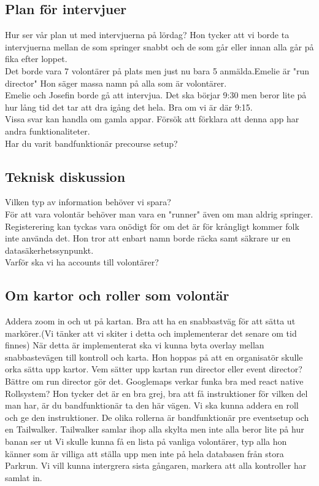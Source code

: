 \documentclass[a4paper, 11pt]{article}
\begin{document}
    \subsection*{Plan för intervjuer}
    Hur ser vår plan ut med intervjuerna på lördag? Hon tycker att vi borde ta intervjuerna mellan de som springer snabbt och de som går eller innan alla går på fika efter loppet.\\
    Det borde vara 7 volontärer på plats men just nu bara 5 anmälda.Emelie är "run director" Hon säger massa namn på alla som är volontärer.\\Emelie och Josefin borde gå att intervjua. Det ska börjar 9:30 men beror lite på hur lång tid det tar att dra igång det hela. Bra om vi är där 9:15. \\
    Vissa svar kan handla om gamla appar. 
    Försök att förklara att denna app har andra funktionaliteter.\\
    Har du varit bandfunktionär precourse setup? 

    \subsection*{Teknisk diskussion}
    Vilken typ av information behöver vi spara? \\För att vara volontär behöver man vara en "runner" även om man aldrig springer.
    Registerering kan tyckas vara onödigt för om det är för krångligt kommer folk inte använda det. 
    Hon tror att enbart namn borde räcka samt säkrare ur en datasäkerhetssynpunkt.\\  
    Varför ska vi ha accounts till volontärer? 

   

   
    \subsection*{Om kartor och roller som volontär}
    Addera zoom in och ut på kartan. Bra att ha en snabbastväg för att sätta ut markörer.(Vi tänker att vi skiter i detta och implementerar det senare om tid finnes) När detta är implementerat ska vi kunna byta overlay mellan snabbastevägen till kontroll och karta.
    Hon hoppas på att en organisatör skulle orka sätta upp kartor.
    Vem sätter upp kartan run director eller event director? 
    Bättre om run director gör det.
    Googlemaps verkar funka bra med react native \\
    Rollsystem? Hon tycker det är en bra grej, bra att få instruktioner för vilken del man har, är du bandfunktionär ta den här vägen.
    Vi ska kunna addera en roll och ge den instruktioner. De olika rollerna är bandfunktionär pre eventsetup och en Tailwalker.
    Tailwalker samlar ihop alla skylta men inte alla beror lite på hur banan ser ut
    Vi skulle kunna få en lista på vanliga volontärer, typ alla hon känner som är villiga att ställa upp men inte på hela databasen från stora Parkrun.
    Vi vill kunna intergrera sista gångaren, markera att alla kontroller har samlat in. 
\end{document}
